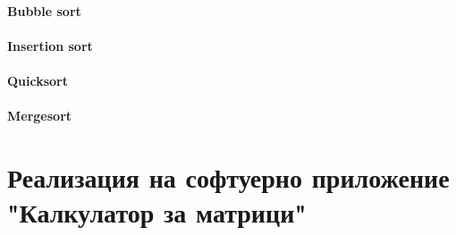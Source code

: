 \documentclass[oneside]{book}
\begin{document}
\subsubsection{Bubble sort}
\subsubsection{Insertion sort}
\subsubsection{Quicksort}
\subsubsection{Mergesort}

\chapter*{Реализация на софтуерно приложение "Калкулатор за матрици"}
\end{document}

